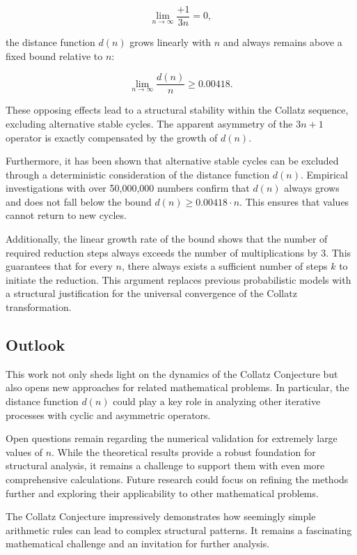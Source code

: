 \documentclass[a4paper,12pt]{article}
\begin{document}
\[
\lim_{n \to \infty} \frac{+1}{3n} = 0,
\]

the distance function \( d(n) \) grows linearly with \( n \) and always remains above a fixed bound relative to \( n \):

\[
\lim_{n \to \infty} \frac{d(n)}{n} \geq 0.00418.
\]

These opposing effects lead to a structural stability within the Collatz sequence, excluding alternative stable cycles. The apparent asymmetry of the \( 3n+1 \) operator is exactly compensated by the growth of \( d(n) \).

Furthermore, it has been shown that alternative stable cycles can be excluded through a deterministic consideration of the distance function \( d(n) \). Empirical investigations with over 50,000,000 numbers confirm that \( d(n) \) always grows and does not fall below the bound \( d(n) \geq 0.00418 \cdot n \). This ensures that values cannot return to new cycles.

Additionally, the linear growth rate of the bound shows that the number of required reduction steps always exceeds the number of multiplications by 3. This guarantees that for every \( n \), there always exists a sufficient number of steps \( k \) to initiate the reduction. This argument replaces previous probabilistic models with a structural justification for the universal convergence of the Collatz transformation.

\subsection{Outlook}

This work not only sheds light on the dynamics of the Collatz Conjecture but also opens new approaches for related mathematical problems. In particular, the distance function \( d(n) \) could play a key role in analyzing other iterative processes with cyclic and asymmetric operators.

Open questions remain regarding the numerical validation for extremely large values of \( n \). While the theoretical results provide a robust foundation for structural analysis, it remains a challenge to support them with even more comprehensive calculations. Future research could focus on refining the methods further and exploring their applicability to other mathematical problems.

The Collatz Conjecture impressively demonstrates how seemingly simple arithmetic rules can lead to complex structural patterns. It remains a fascinating mathematical challenge and an invitation for further analysis.
\end{document}

